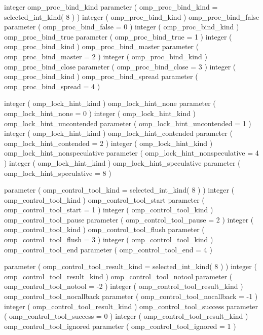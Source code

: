 {{\begin{codepar}
     integer omp\_proc\_bind\_kind
     parameter ( omp\_proc\_bind\_kind = selected\_int\_kind( 8 ) )
     integer ( omp\_proc\_bind\_kind ) omp\_proc\_bind\_false
     parameter ( omp\_proc\_bind\_false = 0 )
     integer ( omp\_proc\_bind\_kind ) omp\_proc\_bind\_true
     parameter ( omp\_proc\_bind\_true = 1 )
     integer ( omp\_proc\_bind\_kind ) omp\_proc\_bind\_master
     parameter ( omp\_proc\_bind\_master = 2 )
     integer ( omp\_proc\_bind\_kind ) omp\_proc\_bind\_close
     parameter ( omp\_proc\_bind\_close = 3 )
     integer ( omp\_proc\_bind\_kind ) omp\_proc\_bind\_spread
     parameter ( omp\_proc\_bind\_spread = 4 )

     integer ( omp\_lock\_hint\_kind ) omp\_lock\_hint\_none
     parameter ( omp\_lock\_hint\_none = 0 )
     integer ( omp\_lock\_hint\_kind ) omp\_lock\_hint\_uncontended
     parameter ( omp\_lock\_hint\_uncontended = 1 )
     integer ( omp\_lock\_hint\_kind ) omp\_lock\_hint\_contended
     parameter ( omp\_lock\_hint\_contended = 2 )
     integer ( omp\_lock\_hint\_kind ) omp\_lock\_hint\_nonspeculative
     parameter ( omp\_lock\_hint\_nonspeculative = 4 )
     integer ( omp\_lock\_hint\_kind ) omp\_lock\_hint\_speculative
     parameter ( omp\_lock\_hint\_speculative = 8 )
\begin{samepage}
     parameter ( omp\_control\_tool\_kind = selected\_int\_kind( 8 ) )
     integer ( omp\_control\_tool\_kind ) omp\_control\_tool\_start 
     parameter ( omp\_control\_tool\_start = 1 )
     integer ( omp\_control\_tool\_kind ) omp\_control\_tool\_pause 
     parameter ( omp\_control\_tool\_pause = 2 )
     integer ( omp\_control\_tool\_kind ) omp\_control\_tool\_flush 
     parameter ( omp\_control\_tool\_flush = 3 )
     integer ( omp\_control\_tool\_kind ) omp\_control\_tool\_end 
     parameter ( omp\_control\_tool\_end = 4 )
\end{samepage}
\begin{samepage}
     parameter ( omp\_control\_tool\_result\_kind = selected\_int\_kind( 8 ) )
     integer ( omp\_control\_tool\_result\_kind ) omp_control_tool_notool 
     parameter ( omp_control_tool_notool = -2 )
     integer ( omp\_control\_tool\_result\_kind ) omp_control_tool_nocallback
     parameter ( omp_control_tool_nocallback = -1 )
     integer ( omp\_control\_tool\_result\_kind ) omp_control_tool_success
     parameter ( omp_control_tool_success = 0 )
     integer ( omp\_control\_tool\_result\_kind ) omp_control_tool_ignored 
     parameter ( omp_control_tool_ignored = 1 )
\end{samepage}
\end{codepar}}

}
